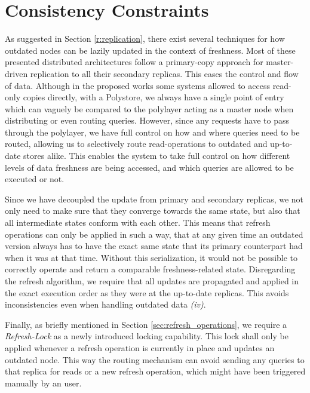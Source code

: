 

\section{Consistency Constraints}
\label{sec:consistency_concept}

As suggested in Section \ref{r:replication}, there exist several techniques for how outdated nodes can be lazily updated in the context of freshness.
Most of these presented distributed architectures follow a primary-copy approach for master-driven replication to all their secondary replicas.
This eases the control and flow of data. Although in the proposed works some systems allowed to access read-only copies directly,
with a Polystore, we always have a single point of entry which can vaguely be compared to the polylayer acting as a master node
when distributing or even routing queries. However, since any requests have to pass through the polylayer,
we have full control on how and where queries need to be routed, allowing us to selectively route read-operations to outdated and up-to-date stores alike.
This enables the system to take full control on how different levels of data freshness are being accessed, and which queries are allowed to be executed or not.

Since we have decoupled the update from primary and secondary replicas, we not only need to make sure that they converge towards the same state, but also that 
all intermediate states conform with each other. This means that refresh operations can only be applied in such a way, that at any given time an outdated version always has
to have the exact same state that its primary counterpart had when it was at that time. Without this serialization, it would not be possible to correctly operate and return 
a comparable freshness-related state. 
Disregarding the refresh algorithm, we require that all updates are propagated and applied in the exact execution order as they were at the up-to-date 
replicas. This avoids inconsistencies even when handling outdated data \textit{(iv)}.

Finally, as briefly mentioned in Section \ref{sec:refresh_operations}, we require a \emph{Refresh-Lock} as a newly introduced locking capability.
This lock shall only be applied whenever a refresh operation is currently in place and updates an outdated node. 
This way the routing mechanism can avoid sending any queries to that replica for reads or a new refresh operation, which might have been triggered manually by an user.



